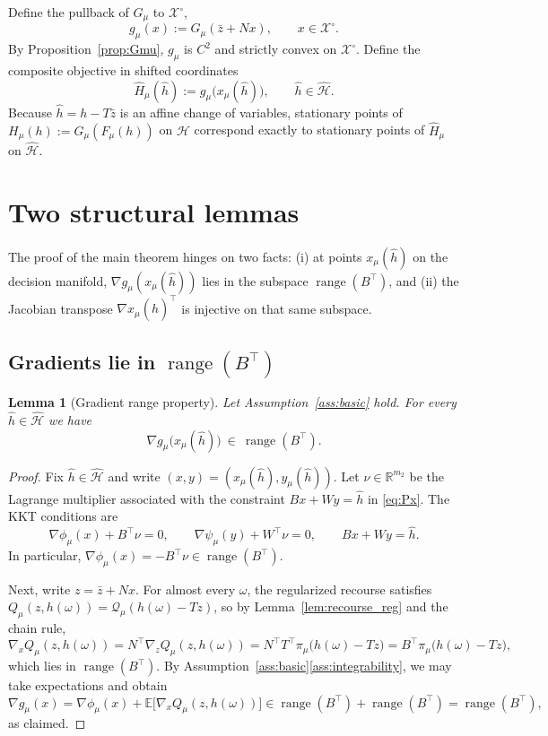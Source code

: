\documentclass[11pt]{article}
\newcommand{\R}{\mathbb{R}}
\newcommand{\E}{\mathbb{E}}
\DeclareMathOperator{\range}{range}
\theoremstyle{plain}
\newtheorem{lemma}{Lemma}
\theoremstyle{definition}
\begin{document}
Define the pullback of $G_\mu$ to $\mathcal{X}^\circ$,
\[
g_\mu(x) := G_\mu(\bar z+Nx),\qquad x\in\mathcal{X}^\circ.
\]
By Proposition~\ref{prop:Gmu}, $g_\mu$ is $C^2$ and strictly convex on $\mathcal{X}^\circ$.
Define the composite objective in shifted coordinates
\begin{equation}\label{eq:Hhat}
\widehat H_\mu(\hat h) := g_\mu\big(x_\mu(\hat h)\big),\qquad \hat h\in\hat{\mathcal{H}}.
\end{equation}
Because $\hat h = h - T\bar z$ is an affine change of variables, stationary points of
$H_\mu(h):=G_\mu(F_\mu(h))$ on $\mathcal{H}$ correspond exactly to stationary points of
$\widehat H_\mu$ on $\hat{\mathcal{H}}$.

\section{Two structural lemmas}

The proof of the main theorem hinges on two facts:
(i) at points $x_\mu(\hat h)$ on the decision manifold, $\nabla g_\mu(x_\mu(\hat h))$ lies in the
subspace $\range(B^\top)$, and (ii) the Jacobian transpose $\nabla x_\mu(\hat h)^\top$ is injective on
that same subspace.

\subsection{Gradients lie in $\range(B^\top)$}

\begin{lemma}[Gradient range property]\label{lem:range}
Let Assumption~\ref{ass:basic} hold.
For every $\hat h\in\hat{\mathcal{H}}$ we have
\[
\nabla g_\mu\big(x_\mu(\hat h)\big)\ \in\ \range(B^\top).
\]
\end{lemma}

\begin{proof}
Fix $\hat h\in\hat{\mathcal{H}}$ and write $(x,y)=(x_\mu(\hat h),y_\mu(\hat h))$.
Let $\nu\in\R^{m_2}$ be the Lagrange multiplier associated with the constraint $Bx+Wy=\hat h$ in
\eqref{eq:Px}. The KKT conditions are
\begin{equation}\label{eq:KKT_Px}
\nabla\phi_\mu(x) + B^\top \nu = 0,\qquad
\nabla\psi_\mu(y) + W^\top \nu = 0,\qquad
Bx+Wy=\hat h.
\end{equation}
In particular, $\nabla\phi_\mu(x)=-B^\top\nu\in\range(B^\top)$.

Next, write $z=\bar z+Nx$. For almost every $\omega$, the regularized recourse satisfies
$Q_\mu(z,h(\omega))=\mathcal{Q}_\mu(h(\omega)-Tz)$, so by Lemma~\ref{lem:recourse_reg} and the chain rule,
\[
\nabla_x Q_\mu(z,h(\omega))
=
N^\top \nabla_z Q_\mu(z,h(\omega))
=
N^\top T^\top \pi_\mu\big(h(\omega)-Tz\big)
=
B^\top \pi_\mu\big(h(\omega)-Tz\big),
\]
which lies in $\range(B^\top)$. By Assumption~\ref{ass:basic}\ref{ass:integrability}, we may take expectations
and obtain
\[
\nabla g_\mu(x)
=
\nabla\phi_\mu(x) + \E\big[\nabla_x Q_\mu(z,h(\omega))\big]
\in \range(B^\top)+\range(B^\top)=\range(B^\top),
\]
as claimed.
\end{proof}
\end{document}
